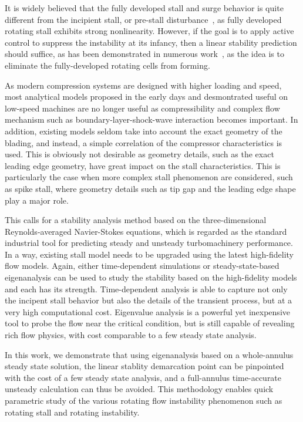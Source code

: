 \documentclass[journal,final]{new-aiaa}
\begin{document}
It is widely believed that the fully developed stall and surge behavior is quite
different from the incipient stall, or pre-stall disturbance~\cite{stenning1980rotating},
as fully developed rotating stall exhibits strong nonlinearity. However, if the goal is
to apply active control to suppress the instability at its infancy, then a linear stability
prediction should suffice, as has been demonstrated in numerous work~\cite{paduano1991active,day1993active,paduano2001compression,day1997stall},
as the idea is to eliminate the fully-developed rotating cells from forming.

As modern compression systems are designed with higher loading and speed,
most analytical models proposed in the early days and desmontrated useful
on low-speed machines are no longer useful as compressibility and complex
flow mechanism such as boundary-layer-shock-wave interaction becomes
important. In addition, existing models seldom take into account the exact
geometry of the blading, and instead, a simple correlation of the compressor
characteristics is used. This is obviously not desirable as
geometry details, such as the exact leading edge geometry, have great impact
on the stall characteristics. This is particularly the case when more complex stall
phenomenon are considered, such as spike stall, where geometry details
such as tip gap and the leading edge shape play a major role.

This calls for a stability analysis method based on the three-dimensional
Reynolds-averaged Navier-Stokes equations, which is regarded as
the standard industrial tool for predicting steady and unsteady turbomachinery
performance. In a way, existing stall model needs to be upgraded using the latest
high-fidelity flow models. Again, either time-dependent simulations or
steady-state-based eigenanalysis can be used to study the stability based
on the high-fidelity models and each has its strength. Time-dependent
analysis is able to capture not only the incipent stall behavior but also the
details of the transient process, but at a very high computational cost.
Eigenvalue analysis is a powerful yet inexpensive tool to probe the flow
near the critical condition, but is still capable of revealing rich flow physics,
with cost comparable to a few steady state analysis.

In this work, we demonstrate that using eigenanalysis based on a whole-annulus
steady state solution, the linear stablity demarcation point can be pinpointed
with the cost of a few steady state analysis, and a full-annulus time-accurate
unsteady calculation can thus be avoided. This methodology enables quick parametric
study of the various rotating flow instability phenomenon
such as rotating stall and rotating instability.
\end{document}

